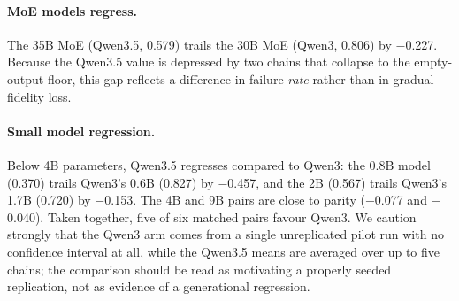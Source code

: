 \paragraph{MoE models regress.}
The 35B MoE (Qwen3.5, 0.579) trails the 30B MoE (Qwen3, 0.806) by
$-$0.227. Because the Qwen3.5 value is depressed by two chains that
collapse to the empty-output floor, this gap reflects a difference in
failure \emph{rate} rather than in gradual fidelity loss.

\paragraph{Small model regression.}
Below 4B parameters, Qwen3.5 regresses compared to Qwen3: the 0.8B model
(0.370) trails Qwen3's 0.6B (0.827) by $-$0.457, and the 2B (0.567)
trails Qwen3's 1.7B (0.720) by $-$0.153. The 4B and 9B pairs are close
to parity ($-$0.077 and $-$0.040). Taken together, five of six matched
pairs favour Qwen3. We caution strongly that the Qwen3 arm comes from a
single unreplicated pilot run with no confidence interval at all, while
the Qwen3.5 means are averaged over up to five chains; the comparison
should be read as motivating a properly seeded replication, not as
evidence of a generational regression.





